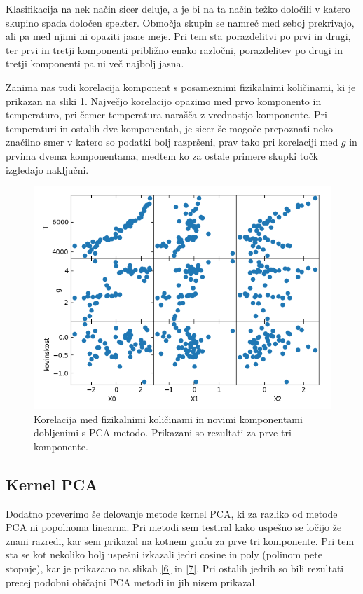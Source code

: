\documentclass[11pt,a4paper]{article}
\begin{document}
Klasifikacija na nek način sicer deluje, a je bi na ta način težko določili v katero skupino spada določen spekter. Območja skupin se namreč med seboj prekrivajo, ali pa med njimi ni opaziti jasne meje. Pri tem sta porazdelitvi po prvi in drugi, ter prvi in tretji komponenti približno enako razločni, porazdelitev po drugi in tretji komponenti pa ni več najbolj jasna.

Zanima nas tudi korelacija komponent s posameznimi fizikalnimi količinami, ki je prikazan na sliki \ref{5}. Največjo korelacijo opazimo med prvo komponento in temperaturo, pri čemer temperatura narašča z vrednostjo komponente. Pri temperaturi in ostalih dve komponentah, je sicer še mogoče prepoznati neko značilno smer v katero so podatki bolj razpršeni, prav tako pri korelaciji med $g$ in prvima dvema komponentama, medtem ko za ostale primere skupki točk izgledajo naključni.

\clearpage

\begin{figure}[h]
    \centering
    \hbox{\hspace{7em}\includegraphics[scale=0.7]{PCA_korelacija}}
    \caption{Korelacija med fizikalnimi količinami in novimi komponentami dobljenimi s PCA metodo. Prikazani so rezultati za prve tri komponente.}
    \label{5}
\end{figure}

\subsection{Kernel PCA}

Dodatno preverimo še delovanje metode kernel PCA, ki za razliko od metode PCA ni popolnoma linearna. Pri metodi sem testiral kako uspešno se ločijo že znani razredi, kar sem prikazal na kotnem grafu za prve tri komponente. Pri tem sta se kot nekoliko bolj uspešni izkazali jedri cosine in poly (polinom pete stopnje), kar je prikazano na slikah \ref{6} in \ref{7}. Pri ostalih jedrih so bili rezultati precej podobni običajni PCA metodi in jih nisem prikazal.
\end{document}
